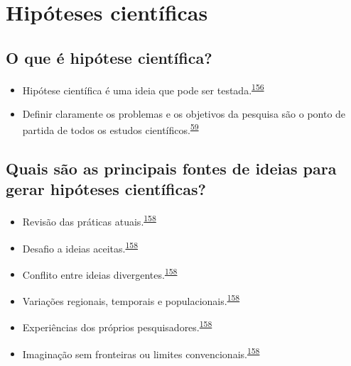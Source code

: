 \documentclass[
  a4paper,
]{book}
\begin{document}
\hypertarget{ideias-hipoteses}{%
\section{Hipóteses científicas}\label{ideias-hipoteses}}

\hypertarget{o-que-uxe9-hipuxf3tese-cientuxedfica}{%
\subsection{O que é hipótese científica?}\label{o-que-uxe9-hipuxf3tese-cientuxedfica}}

\begin{itemize}
\item
  Hipótese científica é uma ideia que pode ser testada.\textsuperscript{\protect\hyperlink{ref-Curran-Everett2009}{156}}
\item
  Definir claramente os problemas e os objetivos da pesquisa são o ponto de partida de todos os estudos científicos.\textsuperscript{\protect\hyperlink{ref-van2022a}{59}}
\end{itemize}

\hypertarget{quais-suxe3o-as-principais-fontes-de-ideias-para-gerar-hipuxf3teses-cientuxedficas}{%
\subsection{Quais são as principais fontes de ideias para gerar hipóteses científicas?}\label{quais-suxe3o-as-principais-fontes-de-ideias-para-gerar-hipuxf3teses-cientuxedficas}}

\begin{itemize}
\item
  Revisão das práticas atuais.\textsuperscript{\protect\hyperlink{ref-Vandenbroucke2018}{158}}
\item
  Desafio a ideias aceitas.\textsuperscript{\protect\hyperlink{ref-Vandenbroucke2018}{158}}
\item
  Conflito entre ideias divergentes.\textsuperscript{\protect\hyperlink{ref-Vandenbroucke2018}{158}}
\item
  Variações regionais, temporais e populacionais.\textsuperscript{\protect\hyperlink{ref-Vandenbroucke2018}{158}}
\item
  Experiências dos próprios pesquisadores.\textsuperscript{\protect\hyperlink{ref-Vandenbroucke2018}{158}}
\item
  Imaginação sem fronteiras ou limites convencionais.\textsuperscript{\protect\hyperlink{ref-Vandenbroucke2018}{158}}
\end{itemize}
\end{document}
